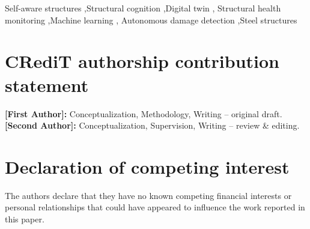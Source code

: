 \documentclass[preprint,12pt]{elsarticle}
\begin{document}
\begin{frontmatter}
\begin{keyword}
Self-aware structures \sep Structural cognition \sep Digital twin \sep
Structural health monitoring \sep Machine learning \sep
Autonomous damage detection \sep Steel structures
\end{keyword}

\end{frontmatter}





























\section*{CRediT authorship contribution statement}
\textbf{[First Author]:} Conceptualization, Methodology, Writing -- original draft.
\textbf{[Second Author]:} Conceptualization, Supervision, Writing -- review \& editing.

\section*{Declaration of competing interest}
The authors declare that they have no known competing financial interests or
personal relationships that could have appeared to influence the work reported in
this paper.



\end{document}
